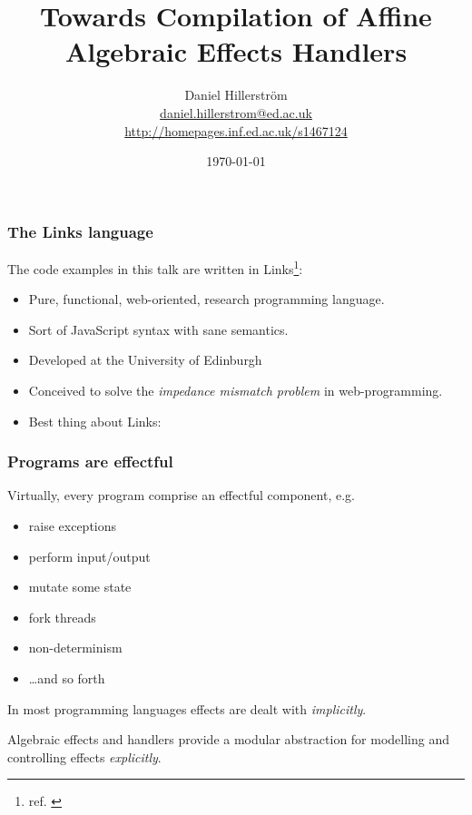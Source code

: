 \documentclass[10pt,compress]{beamer}
\author[Daniel Hillerström]{Daniel Hillerström\\\footnotesize{\href{mailto:daniel.hillerstrom@ed.ac.uk}{daniel.hillerstrom@ed.ac.uk}}\\\href{http://homepages.inf.ed.ac.uk/s1467124}{http://homepages.inf.ed.ac.uk/s1467124}}
\title{Towards Compilation of Affine Algebraic Effects Handlers}
\institute{The University of Edinburgh}
\date{\today}
\begin{document}
\begin{frame}[plain]
  \maketitle
\end{frame}

\begin{frame}
  \frametitle{The Links language}
The code examples in this talk are written in Links\footnote{ref. \citet{Cooper2006}}:
\begin{itemize}
  \item Pure, functional, web-oriented, research programming language.
  \item Sort of JavaScript syntax with sane semantics.
  \item Developed at the University of Edinburgh
  \item Conceived to solve the \emph{impedance mismatch problem} in web-programming.
  \item Best thing about Links: 
\end{itemize}
\end{frame}

\begin{frame}
  \frametitle{Programs are effectful}
Virtually, every program comprise an \alert<1->{effectful} component, e.g.
\begin{itemize}
  \item raise exceptions
  \item perform input/output
  \item mutate some state
  \item fork threads
  \item non-determinism
  \item \dots and so forth 
\end{itemize}
In most programming languages effects are dealt with \emph{implicitly}.

Algebraic effects and handlers provide a modular abstraction for modelling and controlling effects \emph{explicitly}.
\end{frame}
\end{document}
